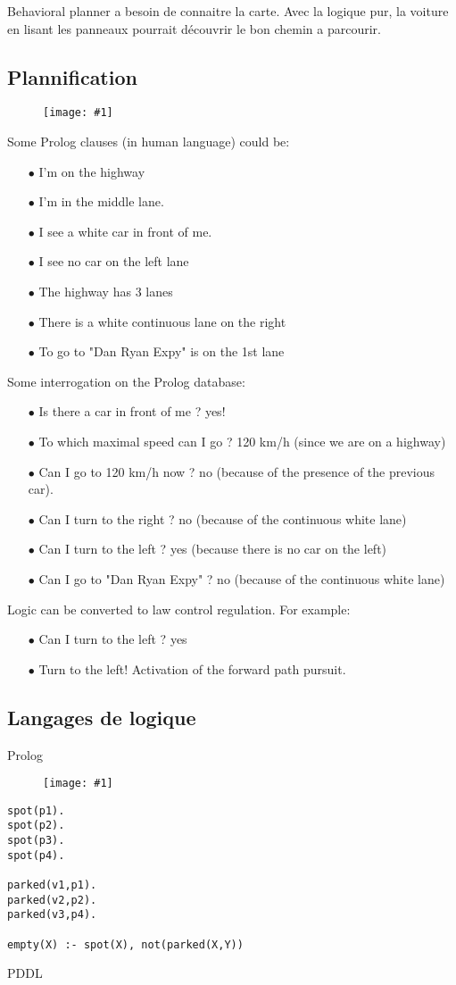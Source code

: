 \documentclass[french, a4paper, 10pt]{article}
\newcommand{\dessin}[4]{
\begin{figure}[htb]
\centering
\texttt{[image: \#1]}
\caption{#3}
\label{#4}
\end{figure}}
\begin{document}
Behavioral planner a besoin de connaitre la carte. Avec la logique pur, la
voiture en lisant les panneaux pourrait découvrir le bon chemin a parcourir.

\subsection{Plannification}

\dessin{pics/autoroute}{0.40}{}{autoroute}

Some Prolog clauses (in human language) could be:
\begin{itemize}
\item[$\bullet$] I'm on the highway
\item[$\bullet$] I'm in the middle lane.
\item[$\bullet$] I see a white car in front of me.
\item[$\bullet$] I see no car on the left lane
\item[$\bullet$] The highway has 3 lanes
\item[$\bullet$] There is a white continuous lane on the right
\item[$\bullet$] To go to "Dan Ryan Expy" is on the 1st lane
\end{itemize}

Some interrogation on the Prolog database:
\begin{itemize}
\item[$\bullet$] Is there a car in front of me ? yes!
\item[$\bullet$] To which maximal speed can I go ? 120 km/h (since we are on a highway)
\item[$\bullet$] Can I go to 120 km/h now ? no (because of the presence of the previous car).
\item[$\bullet$] Can I turn to the right ? no (because of the continuous white lane)
\item[$\bullet$] Can I turn to the left ? yes (because there is no car on the left)
\item[$\bullet$] Can I go to "Dan Ryan Expy" ? no (because  of the continuous white lane)
\end{itemize}

Logic can be converted to law control regulation. For example:
\begin{itemize}
\item[$\bullet$] Can I turn to the left ? yes
\item[$\bullet$] Turn to the left! Activation of the forward path pursuit.
\end{itemize}

\subsection{Langages de logique}

Prolog

\dessin{pics/parking}{0.40}{}{parking}

\begin{verbatim}
spot(p1).
spot(p2).
spot(p3).
spot(p4).

parked(v1,p1).
parked(v2,p2).
parked(v3,p4).

empty(X) :- spot(X), not(parked(X,Y))
\end{verbatim}

PDDL
\end{document}
